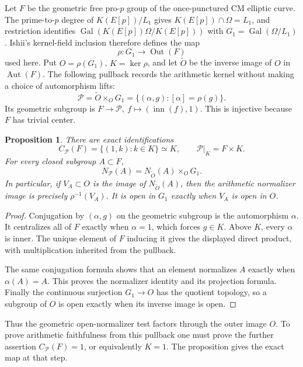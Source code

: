 \documentclass[11pt]{article}
\newtheorem{proposition}[theorem]{Proposition}
\theoremstyle{definition}\newtheorem{definition}[theorem]{Definition}
\begin{document}
Let \(F\) be the geometric free pro-\(p\) group of the
once-punctured CM elliptic curve. The prime-to-\(p\) degree
of \(K(E[p])/L_1\) gives
\(K(E[p])\cap\Omega=L_1\), and restriction identifies
\(\operatorname{Gal}(K(E[p])\Omega/K(E[p]))\) with
\(G_1=\operatorname{Gal}(\Omega/L_1)\).
Ishii's kernel-field inclusion therefore defines the map
\[
 \rho:G_1\longrightarrow\operatorname{Out}(F)
\]
used here.
Put \(O=\rho(G_1)\), \(K=\ker\rho\), and let
\(\widetilde O\) be the inverse image of \(O\) in
\(\operatorname{Aut}(F)\).  The following pullback records the
arithmetic kernel without making a choice of automorphism lifts:
\[
 \mathcal P=\widetilde O\times_O G_1
    =\{(\alpha,g):[\alpha]=\rho(g)\}.
\]
Its geometric subgroup is
\(F\longrightarrow\mathcal P,\ f\longmapsto(\operatorname{inn}(f),1)\).
This is injective because \(F\) has trivial center.

\begin{proposition}\label{prop:cm-actual-centralizer-pullback}
There are exact identifications
\[
 C_{\mathcal P}(F)=\{(1,k):k\in K\}\simeq K,
 \qquad
 \mathcal P|_K=F\times K.
\]
For every closed subgroup \(A\subset F\),
\[
 N_{\mathcal P}(A)=N_{\widetilde O}(A)\times_O G_1.
\]
In particular, if \(V_A\subset O\) is the image of
\(N_{\widetilde O}(A)\), then the arithmetic normalizer image
is precisely \(\rho^{-1}(V_A)\).  It is open in \(G_1\) exactly
when \(V_A\) is open in \(O\).
\end{proposition}

\begin{proof}
Conjugation by \((\alpha,g)\) on the geometric subgroup is
the automorphism \(\alpha\).  It centralizes all of \(F\)
exactly when \(\alpha=1\), which forces \(g\in K\).
Above \(K\), every \(\alpha\) is inner.  The unique element
of \(F\) inducing it gives the displayed direct product,
with multiplication inherited from the pullback.

The same conjugation formula shows that an element normalizes
\(A\) exactly when \(\alpha(A)=A\).  This proves the
normalizer identity and its projection formula.  Finally
the continuous surjection \(G_1\to O\) has the quotient
topology, so a subgroup of \(O\) is open exactly when
its inverse image is open.
\end{proof}

Thus the geometric open-normalizer test factors through the
outer image \(O\).  To prove arithmetic faithfulness
from this pullback one must prove the further assertion
\(C_{\mathcal P}(F)=1\), or equivalently \(K=1\).
The proposition gives the exact map at that step.
\end{document}
